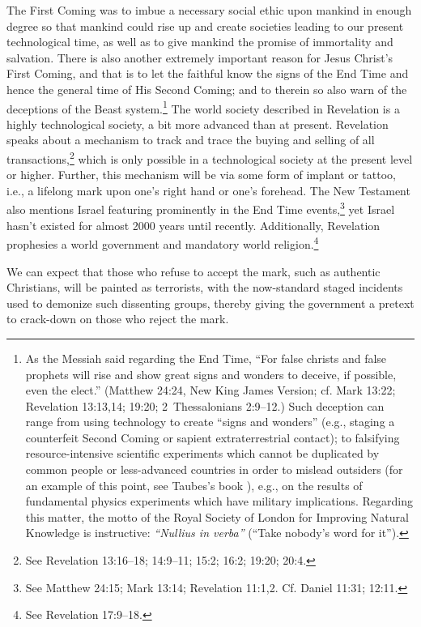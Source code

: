 \documentclass[letterpaper,12pt]{article}
\begin{document}
The First Coming was to imbue a necessary social ethic upon mankind in enough degree so that mankind could rise up and create societies leading to our present technological time, as well as to give mankind the promise of immortality and salvation. There is also another extremely important reason for Jesus Christ's First Coming, and that is to let the faithful know the signs of the End Time and hence the general time of His Second Coming; and to therein so also warn of the deceptions of the Beast system.\footnote{As the Messiah said regarding the End Time, ``For false christs and false prophets will rise and show great signs and wonders to deceive, if possible, even the elect.'' (Matthew 24:24, New King James Version; cf. Mark 13:22; Revelation 13:13,14; 19:20; 2~Thessalonians 2:9--12.) Such deception can range from using technology to create ``signs and wonders'' (e.g., staging a counterfeit Second Coming or sapient extraterrestrial contact); to falsifying resource-intensive scientific experiments which cannot be duplicated by common people or less-advanced countries in order to mislead outsiders (for an example of this point, see Taubes's book \cite{Taubes1986}), e.g., on the results of fundamental physics experiments which have military implications. Regarding this matter, the motto of the Royal Society of London for Improving Natural Knowledge is instructive: \emph{``Nullius in verba''} (``Take nobody's word for it'').} The world society described in Revelation is a highly technological society, a bit more advanced than at present. Revelation speaks about a mechanism to track and trace the buying and selling of all transactions,\footnote{See Revelation 13:16--18; 14:9--11; 15:2; 16:2; 19:20; 20:4.} which is only possible in a technological society at the present level or higher. Further, this mechanism will be via some form of implant or tattoo, i.e., a lifelong mark upon one's right hand or one's forehead. The New Testament also mentions Israel featuring prominently in the End Time events,\footnote{See Matthew 24:15; Mark 13:14; Revelation 11:1,2. Cf. Daniel 11:31; 12:11.} yet Israel hasn't existed for almost 2000 years until recently. Additionally, Revelation prophesies a world government and mandatory world religion.\footnote{See Revelation 17:9--18.}

We can expect that those who refuse to accept the mark, such as authentic Christians, will be painted as terrorists, with the now-standard staged incidents used to demonize such dissenting groups, thereby giving the government a pretext to crack-down on those who reject the mark.
\end{document}

